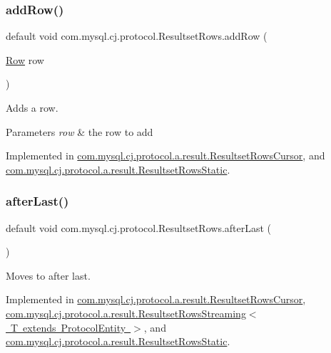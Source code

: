 \subsubsection{\texorpdfstring{add\+Row()}{addRow()}}
{\footnotesize\ttfamily default void com.\+mysql.\+cj.\+protocol.\+Resultset\+Rows.\+add\+Row (\begin{DoxyParamCaption}\item[{\mbox{\hyperlink{interfacecom_1_1mysql_1_1cj_1_1result_1_1_row}{Row}}}]{row }\end{DoxyParamCaption})}

Adds a row.


\begin{DoxyParams}{Parameters}
{\em row} & the row to add \\
\hline
\end{DoxyParams}


Implemented in \mbox{\hyperlink{classcom_1_1mysql_1_1cj_1_1protocol_1_1a_1_1result_1_1_resultset_rows_cursor_a34e3f6465619fc988b570afca93db969}{com.\+mysql.\+cj.\+protocol.\+a.\+result.\+Resultset\+Rows\+Cursor}}, and \mbox{\hyperlink{classcom_1_1mysql_1_1cj_1_1protocol_1_1a_1_1result_1_1_resultset_rows_static_a4546e3ad8ce7f65d7c37d306ec4a1e48}{com.\+mysql.\+cj.\+protocol.\+a.\+result.\+Resultset\+Rows\+Static}}.

\mbox{\label{interfacecom_1_1mysql_1_1cj_1_1protocol_1_1_resultset_rows_a9b69d770817c03e132e2561a228e5951}} 
\subsubsection{\texorpdfstring{after\+Last()}{afterLast()}}
{\footnotesize\ttfamily default void com.\+mysql.\+cj.\+protocol.\+Resultset\+Rows.\+after\+Last (\begin{DoxyParamCaption}{ }\end{DoxyParamCaption})}

Moves to after last. 

Implemented in \mbox{\hyperlink{classcom_1_1mysql_1_1cj_1_1protocol_1_1a_1_1result_1_1_resultset_rows_cursor_a1fc9c638ba70a1fd6cabeb6ba0a2b0fe}{com.\+mysql.\+cj.\+protocol.\+a.\+result.\+Resultset\+Rows\+Cursor}}, \mbox{\hyperlink{classcom_1_1mysql_1_1cj_1_1protocol_1_1a_1_1result_1_1_resultset_rows_streaming_af58c1ee8e6bddf5ef73508bc9292a0a2}{com.\+mysql.\+cj.\+protocol.\+a.\+result.\+Resultset\+Rows\+Streaming$<$ T extends Protocol\+Entity $>$}}, and \mbox{\hyperlink{classcom_1_1mysql_1_1cj_1_1protocol_1_1a_1_1result_1_1_resultset_rows_static_a2714df97d4c52ca2993214815e6d5594}{com.\+mysql.\+cj.\+protocol.\+a.\+result.\+Resultset\+Rows\+Static}}.

